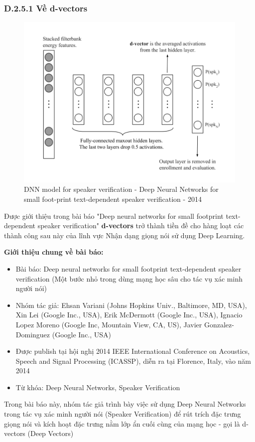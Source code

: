 \documentclass{article}
\begin{document}
	\subsubsection{D.2.5.1 Về d-vectors}
	\begin{figure}[H]
		\centering
		\includegraphics[width=0.75\linewidth]{images/d-vectors.png}
		\caption{DNN model for speaker verification - Deep Neural Networks for small foot-print text-dependent speaker verification - 2014}
		\label{fig:writing-thesis}
	\end{figure}
	\qquad Được giới thiệu trong bài báo "Deep neural networks for small footprint text-dependent speaker verification" \textbf{d-vectors} trở thành tiền đề cho hàng loạt các thành công sau này của lĩnh vực Nhận dạng giọng nói sử dụng Deep Learning.
	
	\textbf{Giới thiệu chung về bài báo:}
	\begin{itemize}
		\item Bài báo: Deep neural networks for small footprint text-dependent speaker verification (Một bước nhỏ trong dùng mạng học sâu cho tác vụ xác minh người nói)
		\item Nhóm tác giả: Ehsan Variani (Johns Hopkins Univ., Baltimore, MD, USA), Xin Lei (Google Inc., USA), Erik McDermott (Google Inc., USA), Ignacio Lopez Moreno (Google Inc, Mountain View, CA, US), Javier Gonzalez-Dominguez (Google Inc., USA)
		\item Được publish tại hội nghị 2014 IEEE International Conference on Acoustics, Speech and Signal Processing (ICASSP), diễn ra tại Florence, Italy, vào năm 2014
		\item Từ khóa: Deep Neural Networks, Speaker Verification
	\end{itemize}

	Trong bài báo này, nhóm tác giả trình bày việc sử dụng Deep Neural Networks trong tác vụ xác minh người nói (Speaker Verification) để rút trích đặc trưng giọng nói và kích hoạt đặc trưng nằm lớp ẩn cuối cùng của mạng học - gọi là d-vectors (Deep Vectors)
	
\end{document}
